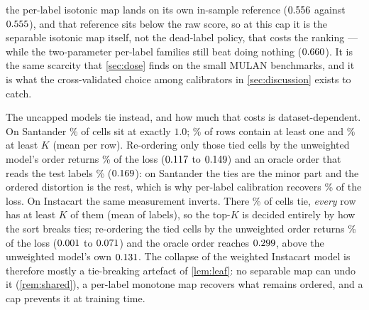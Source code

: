 \documentclass[sigconf,nonacm]{acmart}
\begin{document}
the per-label isotonic map lands on its own in-sample reference ($0.556$ against $0.555$), and that reference sits below the raw score, so at this cap it is the separable isotonic map itself, not the dead-label policy, that costs the ranking --- while the two-parameter per-label families still beat doing nothing ($0.660$). It is the same scarcity that \cref{sec:dose} finds on the small MULAN benchmarks, and it is what the cross-validated choice among calibrators in \cref{sec:discussion} exists to catch.

The uncapped models tie instead, and how much that costs is dataset-dependent. On Santander \nStieCellsExactOne\% of cells sit at exactly $1.0$; \nStieRowsGeOne\% of rows contain at least one and \nStieRowsGeK\% at least $K$ (mean \nStieCellsPerRowMean{} per row). Re-ordering only those tied cells by the unweighted model's order returns \ntieShareUnw\% of the loss ($0.117$ to $0.149$) and an oracle order that reads the test labels \ntieShareOracle\% ($0.169$): on Santander the ties are the minor part and the ordered distortion is the rest, which is why per-label calibration recovers \nrepairShare\% of the loss. On Instacart the same measurement inverts. There \nIStieCellsExactOne\% of cells tie, \emph{every} row has at least $K$ of them (mean \nIStieCellsPerRowMean{} of \nInLabels{} labels), so the top-$K$ is decided entirely by how the sort breaks ties; re-ordering the tied cells by the unweighted order returns \nItieShareUnw\% of the loss ($0.001$ to $0.071$) and the oracle order reaches $0.299$, above the unweighted model's own $0.131$. The collapse of the weighted Instacart model is therefore mostly a tie-breaking artefact of \cref{lem:leaf}: no separable map can undo it (\cref{rem:shared}), a per-label monotone map recovers what remains ordered, and a cap prevents it at training time.
\end{document}
